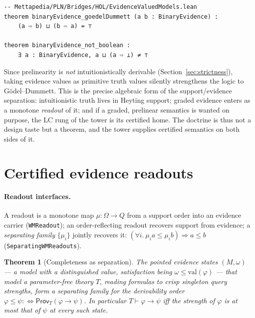 \documentclass[11pt]{article}
\newcommand{\code}[1]{\texttt{#1}}
\newcommand{\Prov}{\mathsf{Prov}}
\theoremstyle{plain}
\newtheorem{theorem}{Theorem}[section]
\theoremstyle{definition}
\begin{document}
\begin{lstlisting}
-- Mettapedia/PLN/Bridges/HOL/EvidenceValuedModels.lean
theorem binaryEvidence_goedelDummett (a b : BinaryEvidence) :
    (a ⇨ b) ⊔ (b ⇨ a) = ⊤

theorem binaryEvidence_not_boolean :
    ∃ a : BinaryEvidence, a ⊔ (a ⇨ ⊥) ≠ ⊤
\end{lstlisting}

Since prelinearity is \emph{not} intuitionistically derivable
(Section~\ref{sec:strictness}), taking evidence values as primitive truth
values silently strengthens the logic to G\"odel--Dummett.  This is the
precise algebraic form of the support/evidence separation: intuitionistic
truth lives in Heyting support; graded evidence enters as a monotone
\emph{readout} of it; and if a graded, prelinear semantics is wanted on
purpose, the LC rung of the tower is its certified home.  The doctrine is
thus not a design taste but a theorem, and the tower supplies certified
semantics on both sides of it.

\section{Certified evidence readouts}\label{sec:readouts}

\paragraph{Readout interfaces.}  A readout is a monotone map
$\mu:\Omega\to Q$ from a support order into an evidence carrier
(\code{WMReadout}); an order-reflecting readout recovers support from
evidence; a \emph{separating family} $\{\mu_i\}$ jointly recovers it:
$(\forall i.\ \mu_i a\le \mu_i b)\Rightarrow a\le b$
(\code{SeparatingWMReadouts}).

\begin{theorem}[Completeness as separation]
The pointed evidence states $(M,\omega)$ --- a model with a distinguished
value, satisfaction being $\omega\le\mathrm{val}(\varphi)$ --- that model a
parameter-free theory $T$, reading formulas to crisp singleton query
strengths, form a separating family for the derivability order
$\varphi\le\psi:\Leftrightarrow\Prov_T(\varphi\to\psi)$.  In particular
$T\vdash\varphi\to\psi$ iff the strength of $\varphi$ is at most that of
$\psi$ at every such state.
\end{theorem}
\end{document}
